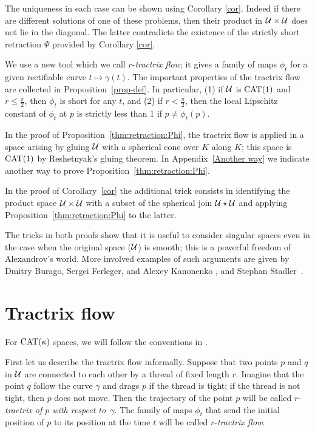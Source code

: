 \documentclass[oneside,a4paper, 12pt]{article}
\begin{document}
The uniqueness in each case can be shown using Corollary \ref{cor}.
Indeed if there are different solutions of one of these problems, then their product in ${\mathcal{U}}\times {\mathcal{U}}$ does not lie in the diagonal.
The latter contradicts the existence of the strictly short retraction $\Psi$ provided by Corollary \ref{cor}.

We use a new tool which we call $r$-\emph{tractrix flow}; it gives a family of maps $\phi_t$ for a given rectifiable curve $t\mapsto\gamma(t)$.
The important properties of the tractrix flow are collected in Proposition~\ref{prop-def}.
In particular, (1) if $\mathcal{U}$ is $\mathrm{CAT}(1)$ and $r\le \tfrac\pi2$, then $\phi_t$ is short for any $t$, 
and (2) if $r< \tfrac\pi2$, then the local Lipschitz constant of $\phi_t$ at $p$ is strictly less than 1 if $p\ne \phi_t(p)$.

In the proof of Proposition~\ref{thm:retraction:Phi}, the tractrix flow is applied in a space arising by gluing $\mathcal{U}$ with a spherical cone over $K$ along $K$;
this space is $\mathrm{CAT}(1)$ by Reshetnyak's gluing theorem.
In Appendix~\ref{Another way} we indicate another way to prove Proposition~\ref{thm:retraction:Phi}.

In the proof of Corollary~\ref{cor} the additional trick consists in identifying the product space $\spc{U}\z\times \spc{U}$ with a subset of the spherical join $\mathcal{U}\star \mathcal{U}$ and applying  Proposition~\ref{thm:retraction:Phi} to the latter.

The tricks in both proofs show that it is useful to consider singular spaces even in the case when the original space ($\mathcal{U}$) is smooth;
this is a powerful freedom of Alexandrov's world.
More involved examples of such arguments are given by Dmitry Burago, Sergei Ferleger, and Alexey Kanonenko \cite{BFK}, and Stephan Stadler~\cite{stadler}.

\section{Tractrix flow}\label{sec:Tractrix flow}

For $\mathrm{CAT}(\kappa)$ spaces, we will follow the conventions in \cite{akp}.

First let us describe the tractrix flow informally.
Suppose that two points $p$ and $q$ in ${\mathcal{U}}$ are connected to each other by a thread of fixed length $r$.
Imagine that the point $q$ follow the curve $\gamma$ and drags $p$ if the thread is tight; 
if the thread is not tight, then $p$ does not move.
Then the trajectory of the point $p$ will be called $r$-\emph{tractrix of $p$ with respect to~$\gamma$}.
The family of maps $\phi_t$ that send the initial position of $p$ to its position at the time $t$ will be called $r$-\emph{tractrix flow}.
\end{document}
